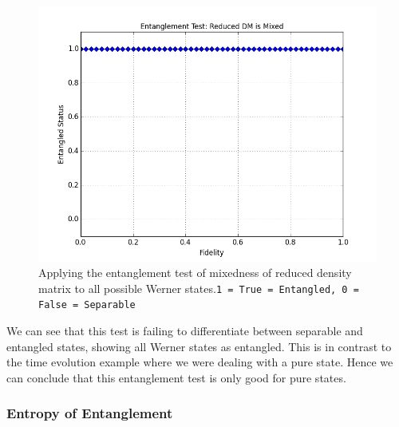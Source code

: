 \begin{figure}[H]
  \begin{center}
    \includegraphics[scale=0.62]{figures/wernerstates-reducedmixed.png}
    \caption{Applying the entanglement test of mixedness of reduced density matrix to all possible Werner states.\newline \texttt{1 = True = Entangled,    0 = False = Separable}}
    \label{fig: Werner States: Mixedness of Reduced DM}
  \end{center}
\end{figure}

We can see that this test is failing to differentiate between separable and entangled states, showing all Werner states as entangled. This is in contrast to the time evolution example where we were dealing with a pure state. Hence we can conclude that this entanglement test is only good for pure states.

\subsubsection{Entropy of Entanglement}

